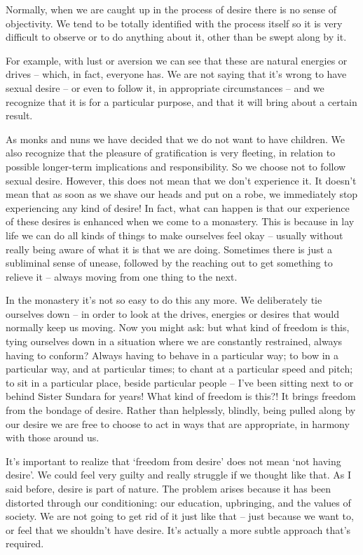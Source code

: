Normally, when we are caught up in the process of desire there is no sense of objectivity. We tend to be totally identified with the process itself so it is very difficult to observe or to do anything about it, other than be swept along by it.

For example, with lust or aversion we can see that these are natural energies or drives -- which, in fact, everyone has. We are not saying that it's wrong to have sexual desire -- or even to follow it, in appropriate circumstances -- and we recognize that it is for a particular purpose, and that it will bring about a certain result. 

As monks and nuns we have decided that we do not want to have children. We also recognize that the pleasure of gratification is very fleeting, in relation to possible longer-term implications and responsibility. So we choose not to follow sexual desire. However, this does not mean that we don't experience it. It doesn't mean that as soon as we shave our heads and put on a robe, we immediately stop experiencing any kind of desire! In fact, what can happen is that our experience of these desires is enhanced when we come to a monastery. This is because in lay life we can do all kinds of things to make ourselves feel okay -- usually without really being aware of what it is that we are doing. Sometimes there is just a subliminal sense of unease, followed by the reaching out to get something to relieve it -- always moving from one thing to the next.

In the monastery it's not so easy to do this any more. We deliberately tie ourselves down -- in order to look at the drives, energies or desires that would normally keep us moving. Now you might ask: but what kind of freedom is this, tying ourselves down in a situation where we are constantly restrained, always having to conform? Always having to behave in a particular way; to bow in a particular way, and at particular times; to chant at a particular speed and pitch; to sit in a particular place, beside particular people -- I've been sitting next to or behind Sister Sundara for years! What kind of freedom is this?! It brings freedom from the bondage of desire. Rather than helplessly, blindly, being pulled along by our desire we are free to choose to act in ways that are appropriate, in harmony with those around us.

It's important to realize that `freedom from desire' does not mean `not having desire'. We could feel very guilty and really struggle if we thought like that. As I said before, desire is part of nature. The problem arises because it has been distorted through our conditioning: our education, upbringing, and the values of society. We are not going to get rid of it just like that -- just because we want to, or feel that we shouldn't have desire. It's actually a more subtle approach that's required.

